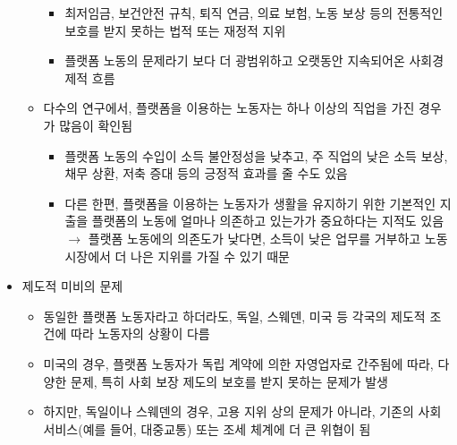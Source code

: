 \begin{itemize}
\begin{itemize}
		\begin{itemize}
		\item 최저임금, 보건안전 규칙, 퇴직 연금, 의료 보험, 노동 보상 등의 전통적인 보호를 받지 못하는 법적 또는 재정적 지위
		\item 플랫폼 노동의 문제라기 보다 더 광범위하고 오랫동안 지속되어온 사회경제적 흐름
		\end{itemize}
	\item 다수의 연구에서, 플랫폼을 이용하는 노동자는 하나 이상의 직업을 가진 경우가 많음이 확인됨
		\begin{itemize}
		\item 플랫폼 노동의 수입이 소득 불안정성을 낮추고, 주 직업의 낮은 소득 보상, 채무 상환, 저축 증대 등의 긍정적 효과를 줄 수도 있음
		\item 다른 한편, 플랫폼을 이용하는 노동자가 생활을 유지하기 위한 기본적인 지출을 플랫폼의 노동에 얼마나 의존하고 있는가가 중요하다는 지적도 있음  $\rightarrow$ 플랫폼 노동에의 의존도가 낮다면, 소득이 낮은 업무를 거부하고 노동 시장에서 더 나은 지위를 가질 수 있기 때문 \citep{Schor:2020vg}
		\end{itemize}
	\end{itemize}
\item 제도적 미비의 문제 \citep{Thelen:2018tl}
	\begin{itemize}
	\item 동일한 플랫폼 노동자라고 하더라도, 독일, 스웨덴, 미국 등 각국의 제도적 조건에 따라 노동자의 상황이 다름
	\item 미국의 경우, 플랫폼 노동자가 독립 계약에 의한 자영업자로 간주됨에 따라, 다양한 문제, 특히 사회 보장 제도의 보호를 받지 못하는 문제가 발생
	\item 하지만, 독일이나 스웨덴의 경우, 고용 지위 상의 문제가 아니라, 기존의 사회 서비스(예를 들어, 대중교통) 또는 조세 체계에 더 큰 위협이 됨
	\end{itemize}
\end{itemize}	

\pagebreak

